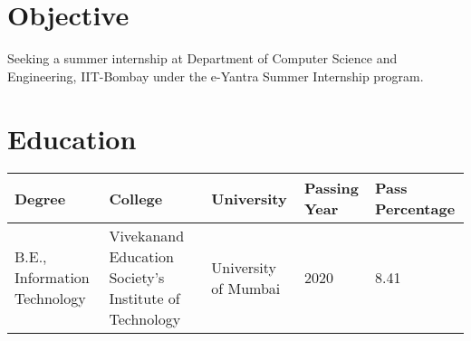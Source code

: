 \documentclass[margin]{res}
\begin{document}
\address{{\bf Address} \\91 A, Kamgar Nagar \\ Kurla East \\ Mumbai 400024}
\address{{\bf Contact Details} \\Mob: +91-9920697529 \\ Email: gayatri.belapurkar5@gmail.com}

\begin{resume}

\section{Objective}
Seeking a summer internship at Department of Computer Science and Engineering, IIT-Bombay under the e-Yantra Summer Internship program. 

\section{Education}
\begin{table}[h!]
  \begin{tabular}{p{4cm}|p{4cm}|p{2cm}|p{1.5cm}|p{1.5cm}}
    \textbf{Degree} & \textbf{College} & \textbf{University} & \textbf{Passing Year} & \textbf{Pass Percentage} \\
    \hline
    B.E., Information Technology & Vivekanand Education Society's Institute of Technology & University of Mumbai & 2020 & 8.41\\
    \end{tabular}
\end{table}


\end{resume}
\end{document}
